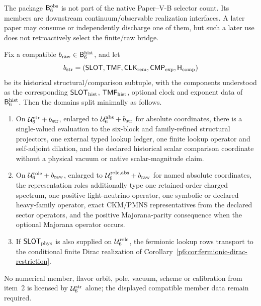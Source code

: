 \documentclass[12pt,a4paper]{article}
\newcommand{\BridgeRaw}{\mathsf B_6^{\rm hist}}
\newcommand{\BridgeObs}{\mathsf B_6^{\rm obs}}
\newcommand{\CLKrem}{\mathsf{CLK}_{\rm rem}}
\newcommand{\Ubase}{\mathcal U_6^{\rm str}}
\newcommand{\Urole}{\mathcal U_6^{\rm role}}
\newcommand{\Uabs}{\mathcal U_6^{\rm abs}}
\newcommand{\Uroleabs}{\mathcal U_6^{\rm role,abs}}
\newcommand{\CMPexp}{\mathsf{CMP}_{\rm exp}}
\begin{document}
\begin{remark}
\label{p6:rem:bridgeobs-downstream-status}
The package \(\BridgeObs\) is not part of the native Paper--V-B selector count.
Its members are downstream continuum/observable realization interfaces.  A
later paper may consume or independently discharge one of them, but such a
later use does not retroactively select the finite/raw bridge.
\end{remark}

\begin{theorem}
\label{p6:thm:conditional-finite-sufficiency}
Fix a compatible \(b_{\rm raw}\in\BridgeRaw\), and let
\[
b_{\rm str}
=
(\mathsf{SLOT},\mathsf{TMF},\CLKrem,\CMPexp,\mathsf H_{\rm comp})
\]
be its historical structural/comparison subtuple, with the components
understood as the corresponding \(\mathsf{SLOT}_{\rm hist}\),
\(\mathsf{TMF}_{\rm hist}\), optional clock and exponent data
of \(\BridgeRaw\).  Then the domains split minimally as
follows.
\begin{enumerate}[leftmargin=2em]
\item On \(\Ubase+b_{\rm str}\), enlarged to \(\Uabs+b_{\rm str}\) for
absolute coordinates, there is a single-valued evaluation to the six-block
and family-refined structural projectors, one external typed lookup ledger,
one finite lookup operator and self-adjoint dilation, and the declared
historical scalar comparison coordinate without a physical vacuum or native
scalar-magnitude claim.
\item On \(\Urole+b_{\rm raw}\), enlarged to
\(\Uroleabs+b_{\rm raw}\) for named absolute coordinates, the representation
roles additionally type one retained-order charged spectrum, one positive
light-neutrino operator, one symbolic or declared heavy-family operator,
exact CKM/PMNS representatives from the declared sector operators, and the
positive Majorana-parity consequence when the optional Majorana operator
occurs.
\item If \(\mathsf{SLOT}_{\rm phys}\) is also supplied on \(\Urole\), the
fermionic lookup rows transport to the conditional finite Dirac realization
of Corollary~\ref{p6:cor:fermionic-dirac-restriction}.
\end{enumerate}
No numerical member, flavor orbit, pole, vacuum, scheme or calibration from
item~2 is licensed by \(\Ubase\) alone; the displayed compatible member data
remain required.
\end{theorem}
\end{document}
